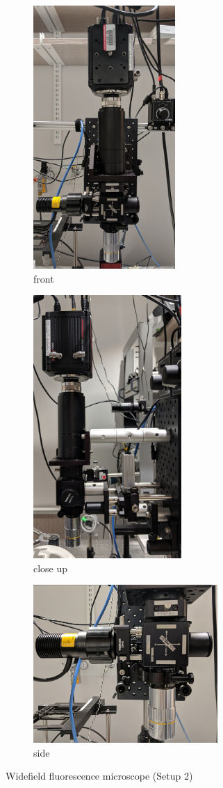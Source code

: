 \begin{figure}[htb]
	\begin{subfigure}[t]{0.45\linewidth}\centering
		\includegraphics[height=10cm]{figures/setup3-front.jpg}
		\caption{front}
	\end{subfigure}
	\hfill
	\begin{subfigure}[t]{0.45\linewidth}\centering
		\includegraphics[height=10cm]{figures/setup3-side.jpg}
		\caption{close up}
	\end{subfigure}
	\begin{subfigure}[t]{\linewidth}\centering
		\includegraphics[width=7cm]{figures/setup3-closeup.jpg}
		\caption{side}
	\end{subfigure}
	\caption{Widefield fluorescence microscope (Setup 2)}
	\label{fig:microscope-2}
\end{figure}

